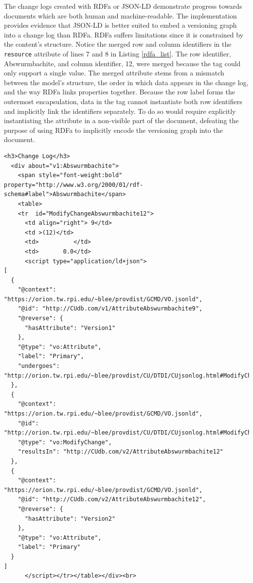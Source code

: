 The change logs created with RDFa or JSON-LD demonstrate progress towards documents which are both human and machine-readable.
The implementation provides evidence that JSON-LD is better suited to embed a versioning graph into a change log than RDFa.
RDFa suffers limitations since it is constrained by the content's structure.
Notice the merged row and column identifiers in the \texttt{resource} attribute of lines 7 and 8 in Listing \ref{rdfa_list}.
The row identifier, Abswurmbachite, and column identifier, 12, were merged because the tag could only support a single value.
The merged attribute stems from a mismatch between the model's structure, the order in which data appears in the change log, and the way RDFa links properties together.
Because the row label forms the outermost encapsulation, data in the tag cannot instantiate both row identifiers and implicitly link the identifiers separately.
To do so would require explicitly instantiating the attribute in a non-visible part of the document, defeating the purpose of using RDFa to implicitly encode the versioning graph into the document.
\begin{mdframed}[topline=false, bottomline=false, leftline=false, rightline=false]
	\begin{verbatim}
<h3>Change Log</h3>
  <div about="v1:Abswurmbachite">
    <span style="font-weight:bold" property="http://www.w3.org/2000/01/rdf-schema#label">Abswurmbachite</span>
    <table>
    <tr  id="ModifyChangeAbswurmbachite12">
      <td align="right"> 9</td>
      <td >(12)</td>
      <td>          </td>
      <td>       0.0</td>
      <script type="application/ld+json">
[
  {
    "@context": "https://orion.tw.rpi.edu/~blee/provdist/GCMD/VO.jsonld", 
    "@id": "http://CUdb.com/v1/AttributeAbswurmbachite9", 
    "@reverse": {
      "hasAttribute": "Version1"
    }, 
    "@type": "vo:Attribute", 
    "label": "Primary", 
    "undergoes": "http://orion.tw.rpi.edu/~blee/provdist/CU/DTDI/CUjsonlog.html#ModifyChangeAbswurmbachite12"
  }, 
  {
    "@context": "https://orion.tw.rpi.edu/~blee/provdist/GCMD/VO.jsonld", 
    "@id": "http://orion.tw.rpi.edu/~blee/provdist/CU/DTDI/CUjsonlog.html#ModifyChangeAbswurmbachite12", 
    "@type": "vo:ModifyChange", 
    "resultsIn": "http://CUdb.com/v2/AttributeAbswurmbachite12"
  }, 
  {
    "@context": "https://orion.tw.rpi.edu/~blee/provdist/GCMD/VO.jsonld", 
    "@id": "http://CUdb.com/v2/AttributeAbswurmbachite12", 
    "@reverse": {
      "hasAttribute": "Version2"
    }, 
    "@type": "vo:Attribute", 
    "label": "Primary"
  }
]
      </script></tr></table></div><br>
	\end{verbatim}
	
\end{mdframed}

